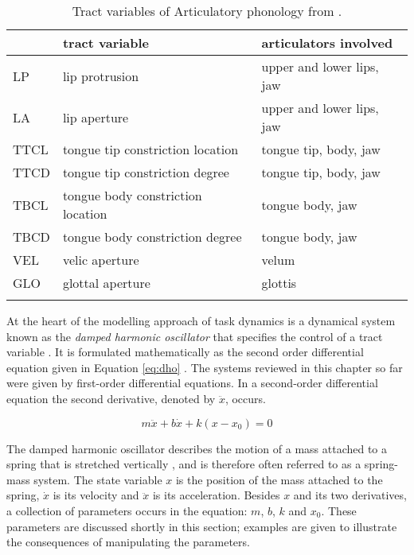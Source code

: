 \begin{table}
\caption{Tract variables of Articulatory phonology from \citet[73]{BrowmanGoldstein1989}.}
\begin{tabularx}{\textwidth}{Xll}
	\lsptoprule
&			tract variable &			articulators involved\\
\midrule
LP &		lip protrusion &				upper and lower lips, jaw\\
LA &		lip aperture &				upper and lower lips, jaw\\
TTCL &	tongue tip constriction location &	tongue tip, body, jaw \\
TTCD &	tongue tip constriction degree &		tongue tip, body, jaw \\
TBCL &	tongue body constriction location &	tongue body, jaw \\
TBCD &	tongue body constriction degree &	tongue body, jaw \\
VEL &	velic aperture &				velum \\
GLO &	glottal aperture &				glottis \\
  \lspbottomrule
\end{tabularx}
\label{tab:tract_vars}
\end{table}%

At the heart of the modelling approach of task dynamics is a dynamical\largerpage{} system known as the \emph{damped harmonic oscillator} that specifies the control of a tract variable \citep{Hawkins1992}. It is formulated mathematically as the second order differential equation given in Equation \ref{eq:dho} \citep{SaltzmanKelso1987}. The systems reviewed in this chapter so far were given by first-order differential equations. In a second-order differential equation the second derivative, denoted by $\ddot{x}$, occurs.

\begin{equation}
m\ddot{x} + b\dot{x} + k(x-x_0) = 0
\label{eq:dho}
\end{equation}

The damped harmonic oscillator describes the motion of a mass attached to a spring that is stretched vertically \citep{FeynmanLeightonSands1963}, and is therefore often referred to as a spring-mass system. The state variable $x$ is the position of the mass attached to the spring, $\dot{x}$ is its velocity and $\ddot{x}$ is its acceleration. Besides $x$ and its two derivatives, a collection of parameters occurs in the equation: $m$, $b$, $k$ and $x_0$. These parameters are discussed shortly in this section; examples are given to illustrate the consequences of manipulating the parameters. 

